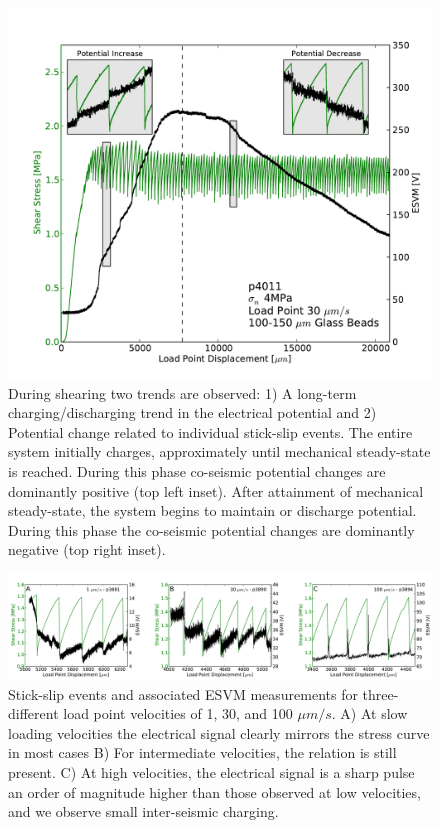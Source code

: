 \begin{figure}
\includegraphics[width=35pc]{chap_electrical/elec_runplot.pdf}
\caption{During shearing two trends are observed: 1) A long-term charging/discharging trend in the electrical potential and 2) Potential change related to individual stick-slip events. The entire system initially charges, approximately until mechanical steady-state is reached. During this phase co-seismic potential changes are dominantly positive (top left inset).  After attainment of mechanical steady-state, the system begins to maintain or discharge potential.  During this phase the co-seismic potential changes are dominantly negative (top right inset).}
\label{electrical_runplot}
\end{figure}

\clearpage

\begin{figure}
\includegraphics[width=35pc]{chap_electrical/elec_zooms.pdf}
\caption{Stick-slip events and associated ESVM measurements for three-different load point velocities of 1, 30, and 100 $\mu m/s$.  A) At slow loading velocities the electrical signal clearly mirrors the stress curve in most cases  B) For intermediate velocities, the relation is still present. C) At high velocities, the electrical signal is a sharp pulse an order of magnitude higher than those observed at low velocities, and we observe small inter-seismic charging.}
\label{electrical_zooms}
\end{figure}


